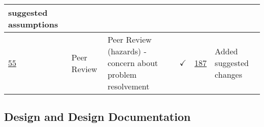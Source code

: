 \documentclass{article}
\begin{document}
\begin{table}[H]
{\begin{tabular}{p{1.5cm} p{2cm} p{3.5cm} c c p{4cm}}
        suggested assumptions \\ \hline
        \href{https://github.com/PlutosCapstone/Plutos/issues/55}{55} & Peer
        Review & Peer Review (hazards) - concern about problem resolvement &
        $\checkmark$ &
        \href{https://github.com/PlutosCapstone/Plutos/pull/187}{187} & Added
        suggested changes \\ 
    \bottomrule
    \end{tabular}%
    }
\end{table}

\newpage 

\subsection{Design and Design Documentation}
\end{document}
